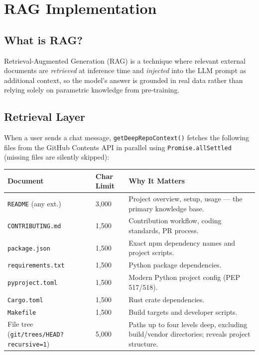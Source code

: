 \documentclass[11pt,a4paper]{article}
\begin{document}
\section{RAG Implementation}

\subsection{What is RAG?}

Retrieval-Augmented Generation (RAG) is a technique where relevant external documents are \emph{retrieved} at inference time and \emph{injected} into the LLM prompt as additional context, so the model's answer is grounded in real data rather than relying solely on parametric knowledge from pre-training.

\subsection{Retrieval Layer}

When a user sends a chat message, \texttt{getDeepRepoContext()} fetches the following files from the GitHub Contents API in parallel using \texttt{Promise.allSettled} (missing files are silently skipped):

\medskip
\begin{longtable}{L{4cm} L{2cm} L{7.5cm}}
    \toprule
    \textbf{Document} & \textbf{Char Limit} & \textbf{Why It Matters} \\
    \midrule
    \endhead
    \bottomrule
    \endfoot

    \texttt{README} (any ext.) & 3,000 & Project overview, setup, usage — the primary knowledge base. \\
    \addlinespace
    \texttt{CONTRIBUTING.md} & 1,500 & Contribution workflow, coding standards, PR process. \\
    \addlinespace
    \texttt{package.json} & 1,500 & Exact npm dependency names and project scripts. \\
    \addlinespace
    \texttt{requirements.txt} & 1,500 & Python package dependencies. \\
    \addlinespace
    \texttt{pyproject.toml} & 1,500 & Modern Python project config (PEP 517/518). \\
    \addlinespace
    \texttt{Cargo.toml} & 1,500 & Rust crate dependencies. \\
    \addlinespace
    \texttt{Makefile} & 1,500 & Build targets and developer scripts. \\
    \addlinespace
    File tree (\texttt{git/trees/HEAD?recursive=1}) & 5,000 & Paths up to four levels deep, excluding build/vendor directories; reveals project structure. \\
\end{longtable}
\end{document}
